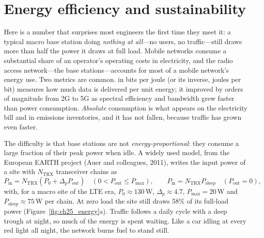 \section{Energy efficiency and sustainability}
\label{sec:ch25:energy}

Here is a number that surprises most engineers the first time they meet it: a typical macro base
station doing \emph{nothing at all}---no users, no traffic---still draws more than half the power
it draws at full load. Mobile networks consume a substantial share of an operator's operating costs in
electricity, and the radio access network---the base stations---accounts for most of a mobile
network's energy use. Two metrics are common.  in bits per joule (or its
inverse, joules per bit) measures how much data is delivered per unit energy; it improved by orders
of magnitude from 2G to 5G as spectral efficiency and bandwidth grew faster than power consumption.
\emph{Absolute} consumption is what appears on the electricity bill and in emissions inventories, and
it has not fallen, because traffic has grown even faster.

The difficulty is that base stations are not \emph{energy-proportional}: they consume a large fraction
of their peak power when idle. A widely used model, from the European EARTH project (Auer and
colleagues, 2011), writes the input power of a site with $N_{\text{TRX}}$ transceiver chains as
\begin{equation}
P_{\text{in}}=N_{\text{TRX}}\left(P_0+\Delta_pP_{\text{out}}\right)\quad(0<P_{\text{out}}\le P_{\max}),
\qquad P_{\text{in}}=N_{\text{TRX}}P_{\text{sleep}}\quad(P_{\text{out}}=0),
\label{eq:ch25:earth}
\end{equation}
with, for a macro site of the LTE era, $P_0\approx130$\,W, $\Delta_p\approx4.7$, $P_{\max}=20$\,W and
$P_{\text{sleep}}\approx75$\,W per chain. At zero load the site still draws 58\% of its full-load power
(Figure~\ref{fig:ch25_energy}a). Traffic follows a daily cycle with a deep trough at night, so much
of the energy is spent waiting. Like a car idling at every red light all night, the network burns
fuel to stand still.


